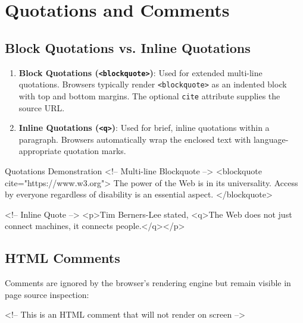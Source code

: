 \section{Quotations and Comments}

\subsection{Block Quotations vs. Inline Quotations}
\begin{enumerate}[leftmargin=1.5em]
    \item \textbf{Block Quotations (\texttt{<blockquote>})}: Used for extended multi-line quotations. Browsers typically render \texttt{<blockquote>} as an indented block with top and bottom margins. The optional \texttt{cite} attribute supplies the source URL.
    \item \textbf{Inline Quotations (\texttt{<q>})}: Used for brief, inline quotations within a paragraph. Browsers automatically wrap the enclosed text with language-appropriate quotation marks.
\end{enumerate}

\begin{htmlcode}{Quotations Demonstration}
<!-- Multi-line Blockquote -->
<blockquote cite="https://www.w3.org">
    The power of the Web is in its universality. Access by everyone regardless of disability is an essential aspect.
</blockquote>

<!-- Inline Quote -->
<p>Tim Berners-Lee stated, <q>The Web does not just connect machines, it connects people.</q></p>
\end{htmlcode}

\subsection{HTML Comments}
Comments are ignored by the browser's rendering engine but remain visible in page source inspection:
\begin{syntaxbox}
<!-- This is an HTML comment that will not render on screen -->
\end{syntaxbox}


